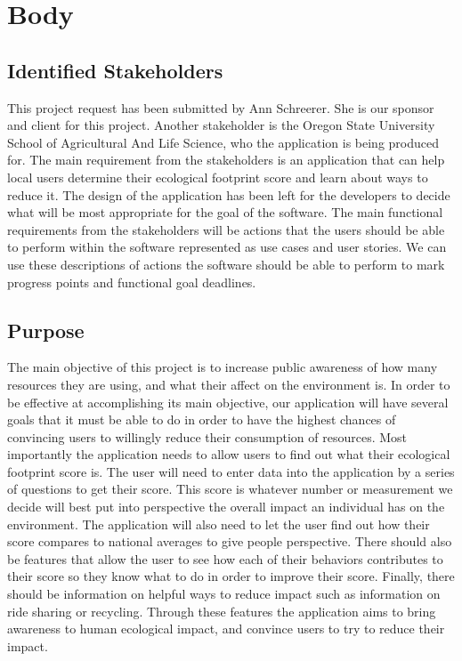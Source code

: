 \documentclass[onecolumn, draftclsnofoot,10pt, compsoc, tikz]{IEEEtran}
\def \CapstoneSponsorCompany{	Oregon State University School of Agricultural And Life Science}
\def \CapstoneSponsorPerson{		Ann Schreerer}
\begin{document}
\clearpage
\section{Body}

\subsection{Identified Stakeholders}
This project request has been submitted by \CapstoneSponsorPerson. She is our sponsor and client for this project.
Another stakeholder is the \CapstoneSponsorCompany, who the application is being produced for.
The main requirement from the stakeholders is an application that can help local users determine their ecological footprint score and learn about ways to reduce it.
The design of the application has been left for the developers to decide what will be most appropriate for the goal of the software.
The main functional requirements from the stakeholders will be actions that the users should be able to perform within the software  represented as use cases and user stories.
We can use these descriptions of actions the software should be able to perform to mark progress points and functional goal deadlines. 


\subsection{Purpose}
The main objective of this project is to increase public awareness of how many resources they are using, and what their affect on the environment is.
In order to be effective at accomplishing its main objective, our application will have several goals that it must be able to do in order to have the highest chances of convincing users to willingly reduce their consumption of resources.
Most importantly the application needs to allow users to find out what their ecological footprint score is.
The user will need to enter data into the application by a series of questions to get their score.
This score is whatever number or measurement we decide will best put into perspective the overall impact an individual has on the environment.
The application will also need to let the user find out how their score compares to national averages to give people perspective.
There should also be features that allow the user to see how each of their behaviors contributes to their score so they know what to do in order to improve their score.
Finally, there should be information on helpful ways to reduce impact such as information on ride sharing or recycling.
Through these features the application aims to bring awareness to human ecological impact, and convince users to try to reduce their impact.
\end{document}
